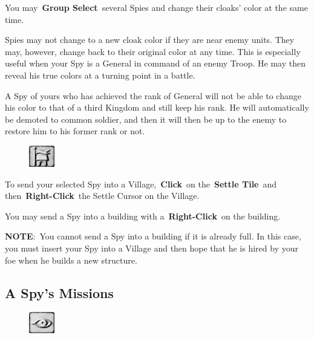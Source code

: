 You may \textbf{Group Select} several Spies and change their cloaks’ color at the same time.

Spies may not change to a new cloak color if they are near enemy units. They may, however, change back to their original color at any time. This is especially useful when your Spy is a General in command of an enemy Troop. He may then reveal his true colors at a turning point in a battle.

A Spy of yours who has achieved the rank of General will not be able to change his color to that of a third Kingdom and still keep his rank. He will automatically be demoted to common soldier, and then it will then be up to the enemy to restore him to his former rank or not.

\begin{figure}
	\vspace{-20pt}
	\begin{center}
		\includegraphics[width=0.1\textwidth]{Tsettle}
	\end{center}
	\vspace{-20pt}
\end{figure}

To send your selected Spy into a Village, \textbf{Click} on the \textbf{Settle Tile} and then \textbf{Right-Click} the Settle Cursor on the Village.

You may send a Spy into a building with a \textbf{Right-Click} on the building.

\textbf{NOTE}: You cannot send a Spy into a building if it is already full. In this case, you must insert your Spy into a Village and then hope that he is hired by your foe when he builds a new structure.

\subsection{A Spy’s Missions}


\begin{figure}
	\vspace{-20pt}
	\begin{center}
		\includegraphics[width=0.1\textwidth]{Tspy}
	\end{center}
	\vspace{-20pt}
\end{figure}

